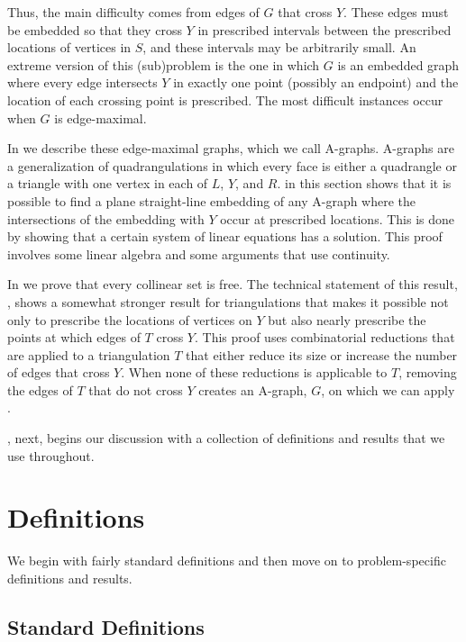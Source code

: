 \documentclass{patmorin}
\begin{document}
Thus, the main difficulty comes from edges of $G$ that cross $Y$.
These edges must be embedded so that they cross $Y$ in prescribed
intervals between the prescribed locations of vertices in $S$, and
these intervals may be arbitrarily small.  An extreme version of this
(sub)problem is the one in which $G$ is an embedded graph where every
edge intersects $Y$ in exactly one point (possibly an endpoint) and
the location of each crossing point is prescribed.  The most difficult
instances occur when $G$ is edge-maximal.

In  we describe these edge-maximal graphs, which
we call A-graphs.  A-graphs are a generalization of quadrangulations in
which every face is either a quadrangle or a triangle with one vertex in
each of $L$, $Y$, and $R$.   in this section shows that it
is possible to find a plane straight-line embedding of any A-graph where
the intersections of the embedding with $Y$ occur at prescribed locations.
This is done by showing that a certain system of linear equations has
a solution. This proof involves some linear algebra and some arguments
that use continuity.

In  we prove that every collinear set is free.
The technical statement of this result, , shows a somewhat
stronger result for triangulations that makes it possible not only to
prescribe the locations of vertices on $Y$ but also nearly prescribe the
points at which edges of $T$ cross $Y$.  This proof uses combinatorial
reductions that are applied to a triangulation $T$ that either reduce its
size or increase the number of edges that cross $Y$.  When none of these
reductions is applicable to $T$, removing the edges of $T$ that do not
cross $Y$ creates an A-graph, $G$, on which we can apply .

, next, begins our discussion with a collection of
definitions and results that we use throughout.


\section{Definitions}

We begin with fairly standard definitions and then move on to problem-specific definitions and results.

\subsection{Standard Definitions}
\end{document}
